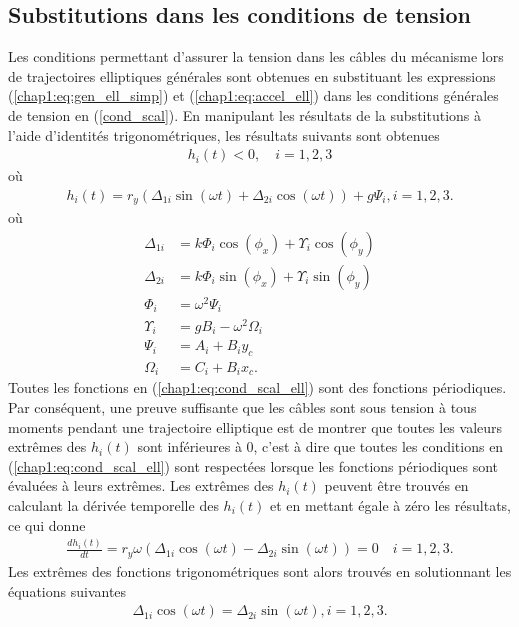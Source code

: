 \subsection{Substitutions dans les conditions de tension}
Les conditions permettant d'assurer la tension dans les câbles du mécanisme lors de trajectoires elliptiques générales sont obtenues en substituant les expressions (\ref{chap1:eq:gen_ell_simp}) et (\ref{chap1:eq:accel_ell}) dans les conditions générales de tension en (\ref{cond_scal}). En manipulant les résultats de la substitutions à l'aide d'identités trigonométriques, les résultats suivants sont obtenues
\begin{align}
h_i(t)<0,\quad i=1,2,3
\label{chap1:eq:cond_scal_ell}
\end{align}
où 
\begin{align}
h_i(t) = r_y\left(\Delta_{1i}\sin(\omega t)+\Delta_{2i}\cos(\omega t)\right)+g\Psi_i, i=1,2,3.
\label{chap1:eq:cond_scal_ell_hi}
\end{align}
où 
\begin{align*}
\Delta_{1i} &= k\Phi_i  \cos(\phi_x) + \Upsilon_i  \cos(\phi_y)\\
\Delta_{2i} &= k\Phi_i  \sin(\phi_x) + \Upsilon_i  \sin(\phi_y)\\
\Phi_i &= \omega^2\Psi_i\\
\Upsilon_i &= gB_i-\omega^2\Omega_i\\
\Psi_i &= A_i + B_iy_c\\
\Omega_i &=C_i+B_ix_c.\label{eq:k}
\end{align*}
Toutes les fonctions en (\ref{chap1:eq:cond_scal_ell}) sont des fonctions périodiques. Par conséquent, une preuve suffisante que les câbles sont sous tension à tous moments pendant une trajectoire elliptique est de montrer que toutes les valeurs extrêmes des $h_i(t)$ sont inférieures à 0, c'est à dire que toutes les conditions en (\ref{chap1:eq:cond_scal_ell}) sont respectées lorsque les fonctions périodiques sont évaluées à leurs extrêmes. Les extrêmes des $h_i(t)$ peuvent être trouvés en calculant la dérivée temporelle des $h_i(t)$ et en mettant égale à zéro les résultats, ce qui donne
\begin{align}
\frac{d h_i(t)}{d t} = r_y\omega\left(\Delta_{1i} \cos(\omega t) - \Delta_{2i} \sin(\omega t)\right) = 0 \quad i = 1,2,3.
\end{align}
Les extrêmes des fonctions trigonométriques sont alors trouvés en solutionnant les équations suivantes \begin{align}
\Delta_{1i} \cos(\omega t) = \Delta_{2i} \sin(\omega t), i=1,2,3.
\end{align}
